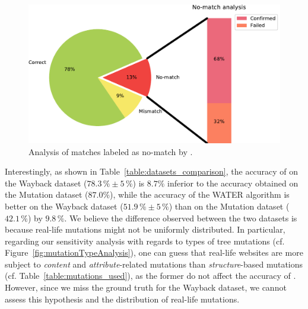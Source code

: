\documentclass[preprint, 12pt]{elsarticle}
\begin{document}
\begin{figure}[]
  \centering
  \includegraphics[width=.75\linewidth]{nomatch-analysis}
  \caption{Analysis of matches labeled as \textsf{no-match} by \erratum{}.}
  \label{fig:nomatch-analysis}
\end{figure}


\vspace{6pt}
Interestingly, as shown in Table~\ref{table:datasets_comparison}, the accuracy of \erratum on the {\sc Wayback} dataset ($78.3\,\% \pm 5\,\%$) is $8.7\%$ inferior to the accuracy obtained on the {\sc Mutation} dataset ($87.0\%$), while the accuracy of the WATER algorithm is better on the {\sc Wayback} dataset ($51.9\,\% \pm 5\,\%$) than on the {\sc Mutation} dataset ($42.1\,\%$) by $9.8\,\%$.
We believe the difference observed between the two datasets is because real-life mutations might not be uniformly distributed.
In particular, regarding our sensitivity analysis with regards to types of tree mutations (cf. Figure~\ref{fig:mutationTypeAnalysis}), one can guess that real-life websites are more subject to \emph{content} and \emph{attribute}-related mutations than \emph{structure}-based mutations (cf. Table~\ref{table:mutations_used}), as the former do not affect the accuracy of \erratum{}.
However, since we miss the ground truth for the {\sc Wayback} dataset, we cannot assess this hypothesis and the distribution of real-life mutations.

\begin{table}[h]
    \caption{Accuracy summary across datasets.}
    \label{table:datasets_comparison}
    \centering
\end{table}
\end{document}
